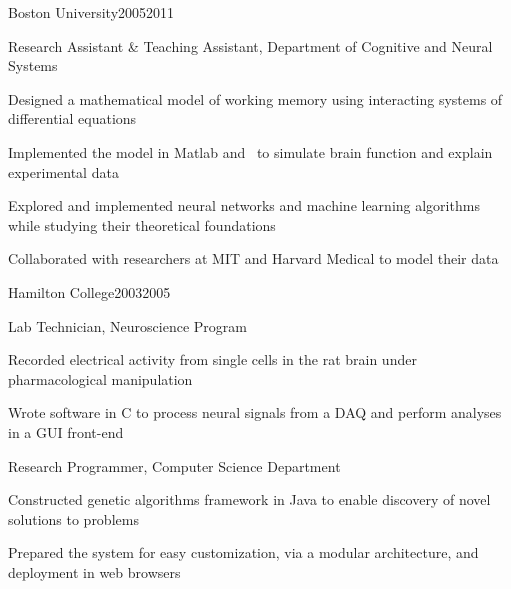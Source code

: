 \documentclass{report}
\begin{document}

  \begin{work_location}{Boston University}{2005}{2011}

    \begin{position}{Research Assistant \& Teaching Assistant, Department of Cognitive and Neural Systems}
      \item Designed a mathematical model of working memory using interacting systems of differential equations
      \item Implemented the model in Matlab and \CC~to simulate brain function and explain experimental data
      \item Explored and implemented neural networks and machine learning algorithms while studying their theoretical foundations
      \item Collaborated with researchers at MIT and Harvard Medical to model their data
    \end{position}

  \end{work_location}



  \begin{work_location}{Hamilton College}{2003}{2005}

    \begin{position}{Lab Technician, Neuroscience Program}
      \item Recorded electrical activity from single cells in the rat brain under pharmacological manipulation
      \item Wrote software in C to process neural signals from a DAQ and perform analyses in a GUI front-end
    \end{position}

    \begin{position}{Research Programmer, Computer Science Department}
      \item Constructed genetic algorithms framework in Java to enable discovery of novel solutions to problems
      \item Prepared the system for easy customization, via a modular architecture, and deployment in web browsers
    \end{position}

  \end{work_location}






\end{document}
